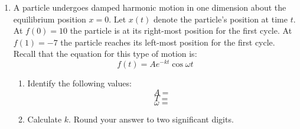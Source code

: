 \documentclass[letterpaper,12pt,fleqn]{article}
\newcommand{\w}{\omega}
\begin{document}
\begin{enumerate}
\item A particle undergoes damped harmonic motion in one dimension about the
  equilibrium position $x=0$. Let $x(t)$ denote the particle's position at
  time $t$. At $f(0)=10$ the particle is at its right-most position for the
  first cycle. At $f(1)=-7$ the particle reaches its left-most position for the
  first cycle. Recall that the equation for this type of motion is:
  \[f(t)=Ae^{-kt}\cos\w t\]
  \begin{enumerate}
  \item Identify the following values:
    \[A=\]
    \[T=\]
    \[\w=\]
  \item Calculate $k$. Round your answer to two significant digits.
  \end{enumerate}

\end{enumerate}
\end{document}
